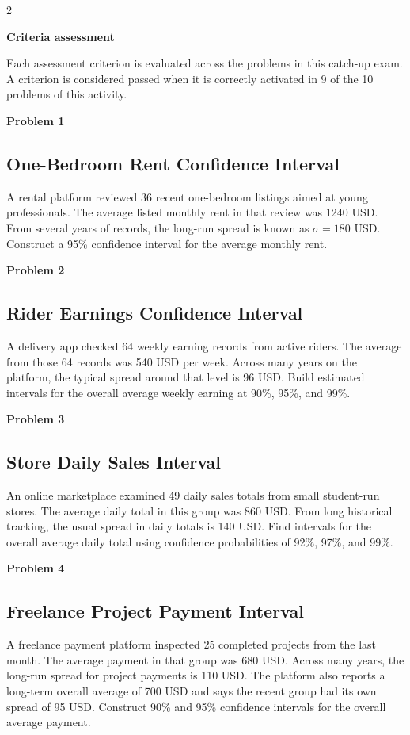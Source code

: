 \documentclass[12pt]{article}
\newcommand{\SubsectionBox}[1]{%
\noindent\colorbox{gray!30}{\parbox{\linewidth}{\textbf{#1}}}\par\vspace{0.35cm}%
}
\begin{document}
\begin{multicols}{2}
	\SubsectionBox{Criteria assessment}\vspace{-0.25cm}
	Each assessment criterion is evaluated across the problems in this catch-up exam. A criterion is considered passed when it is correctly activated in 9 of the 10 problems of this activity.

	\vspace{0.25cm}
\SubsectionBox{Problem 1}
\subsection*{One-Bedroom Rent Confidence Interval}
A rental platform reviewed 36 recent one-bedroom listings aimed at young professionals.
		The average listed monthly rent in that review was 1240 USD.
		From several years of records, the long-run spread is known as $\sigma=180$ USD.
		Construct a 95\% confidence interval for the average monthly rent.

\vspace{0.5cm}
\SubsectionBox{Problem 2}
\subsection*{Rider Earnings Confidence Interval}
A delivery app checked 64 weekly earning records from active riders.
		The average from those 64 records was 540 USD per week.
		Across many years on the platform, the typical spread around that level is 96 USD.
		Build estimated intervals for the overall average weekly earning at 90\%, 95\%, and 99\%.

\vspace{0.5cm}
\SubsectionBox{Problem 3}
\subsection*{Store Daily Sales Interval}
An online marketplace examined 49 daily sales totals from small student-run stores.
		The average daily total in this group was 860 USD.
		From long historical tracking, the usual spread in daily totals is 140 USD.
		Find intervals for the overall average daily total using confidence probabilities of 92\%, 97\%, and 99\%.

\vspace{0.5cm}
\SubsectionBox{Problem 4}
\subsection*{Freelance Project Payment Interval}
A freelance payment platform inspected 25 completed projects from the last month.
		The average payment in that group was 680 USD.
		Across many years, the long-run spread for project payments is 110 USD.
		The platform also reports a long-term overall average of 700 USD and says the recent group had its own spread of 95 USD.
		Construct 90\% and 95\% confidence intervals for the overall average payment.


\end{multicols}
\end{document}
